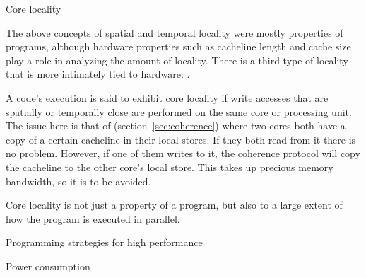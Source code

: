  {Core locality}

The above concepts of spatial and temporal locality were mostly
properties of programs, although hardware properties such as cacheline
length and cache size play a role in analyzing the amount of
locality. There is a third type of locality that is more intimately
tied to hardware: .

A code's execution is said to exhibit core locality if write accesses
that are spatially or temporally close are performed on the same core
or processing unit. The issue here is that of
 (section~\ref{sec:coherence}) where two
cores both have a copy of a certain cacheline in their local stores.
If they both read from it there is no problem. However, if one of them
writes to it, the coherence protocol will copy the cacheline to the
other core's local store. This takes up precious memory bandwidth, so
it is to be avoided.

Core locality is not just a property of a program, but also to a large
extent of how
the program is executed in parallel.

 {Programming strategies for high performance}
\label{sec:performance-programming}


 {Power consumption}
\label{sec:power}


\endinput

\begin{exercise}
  Consider the matrix-vector product operation $y\leftarrow
  Ax$\footnote {The Blas operation for the matrix vector product
    computes $y\leftarrow Ax+y$. The difference in the code involved
    is minimal}:
\begin{verbatim}
for (i<M) {
  s = 0
  for (j<N) {
    s = s + a[i][j] * x[j]; }
  y[i] = s
}
\end{verbatim}
  Can you think of at least one reason why the case $M<N$ would be
  more efficient than $M>N$?
\end{exercise}

